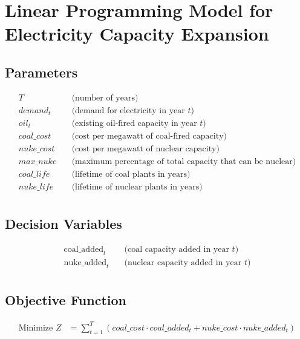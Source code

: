 \documentclass{article}
\begin{document}
\section*{Linear Programming Model for Electricity Capacity Expansion}

\subsection*{Parameters}
\begin{align*}
T & \quad \text{(number of years)} \\
demand_t & \quad \text{(demand for electricity in year } t \text{)} \\
oil_t & \quad \text{(existing oil-fired capacity in year } t \text{)} \\
coal\_cost & \quad \text{(cost per megawatt of coal-fired capacity)} \\
nuke\_cost & \quad \text{(cost per megawatt of nuclear capacity)} \\
max\_nuke & \quad \text{(maximum percentage of total capacity that can be nuclear)} \\
coal\_life & \quad \text{(lifetime of coal plants in years)} \\
nuke\_life & \quad \text{(lifetime of nuclear plants in years)} \\
\end{align*}

\subsection*{Decision Variables}
\begin{align*}
\text{coal\_added}_t & \quad \text{(coal capacity added in year } t\text{)} \\
\text{nuke\_added}_t & \quad \text{(nuclear capacity added in year } t\text{)} \\
\end{align*}

\subsection*{Objective Function}
\begin{align*}
\text{Minimize } Z & = \sum_{t=1}^{T} (coal\_cost \cdot coal\_added_t + nuke\_cost \cdot nuke\_added_t)
\end{align*}
\end{document}
